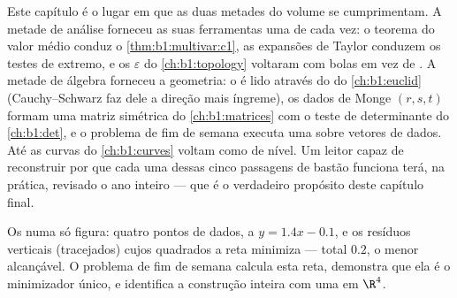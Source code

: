 \begin{remark}
\label{rem:b1:multivar:perspectives}
Este capítulo é o lugar em que as duas metades do volume se
cumprimentam. A metade de análise forneceu as suas ferramentas uma
 de cada vez: o teorema do valor médio conduz o \cref{thm:b1:multivar:c1}, as
expansões de Taylor conduzem os testes de extremo, e os $\varepsilon$ do \cref{ch:b1:topology}
voltaram com bolas em vez de . A metade de álgebra forneceu
a geometria: o  é lido através do  do \cref{ch:b1:euclid}
(Cauchy--Schwarz faz dele a direção mais íngreme), os dados de Monge
$(r, s, t)$ formam uma matriz simétrica do \cref{ch:b1:matrices} com o teste de determinante
do \cref{ch:b1:det}, e o problema de fim de semana executa uma 
sobre vetores de dados. Até as curvas do \cref{ch:b1:curves} voltam como 
de nível. Um leitor capaz de reconstruir por que cada uma dessas cinco
passagens de bastão funciona terá, na prática, revisado o ano inteiro
--- que é o verdadeiro propósito deste capítulo final.
\end{remark}

\begin{omfigure}

{\small Os  numa só figura: quatro pontos de dados, a
 $y = 1.4x - 0.1$, e os resíduos verticais (tracejados) cujos
quadrados a reta minimiza --- total $0.2$, o menor alcançável. O
problema de fim de semana calcula esta reta, demonstra que ela é o
minimizador único, e identifica a construção inteira com uma  em $\R^4$.}
\end{omfigure}

